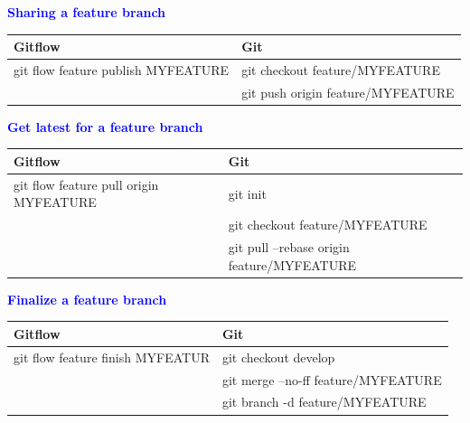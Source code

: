 \documentclass{tufte-handout}
\begin{document}
	    \textbf{\textcolor{blue}{Sharing a feature branch}}
		
		\begin{table}[ht]
			\centering
			\selectfont
			\begin{tabular}{ll}
				Gitflow & Git \\
				\midrule
				git flow feature publish MYFEATURE & git checkout feature/MYFEATURE \\
				& git push origin feature/MYFEATURE \\
			\end{tabular}
			\label{tab:normaltab}
		\end{table}
		\medskip %
		
		\textbf{\textcolor{blue}{Get latest for a feature branch}}
		
		\begin{table}[ht]
			\centering
			\selectfont
			\begin{tabular}{ll}
				Gitflow & Git \\
				\midrule
				git flow feature pull origin MYFEATURE & git init \\
				& git checkout feature/MYFEATURE \\
				& git pull --rebase origin feature/MYFEATURE \\
			\end{tabular}
			\label{tab:normaltab}
		\end{table}
		\medskip %
		
				
		\clearpage

		\textbf{\textcolor{blue}{Finalize a feature branch}}
		
		\begin{table}[ht]
			\centering
			\selectfont
			\begin{tabular}{ll}
				Gitflow & Git \\
				\midrule
				git flow feature finish MYFEATUR & git checkout develop \\
				& git merge --no-ff feature/MYFEATURE \\
				& git branch -d feature/MYFEATURE \\
			\end{tabular}
			\label{tab:normaltab}
		\end{table}
		\medskip %
		
\end{document}
